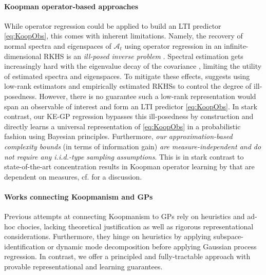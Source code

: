 \paragraph{Koopman operator-based approaches}
While operator regression \citep{Williams2015ADecomposition,Klus2020EigendecompositionsSpaces,Kostic2022LearningSpaces,Li2022OptimalLearning,Ishikawa2024,Mauroy2024,Meunier2024} could be applied to build an LTI predictor \eqref{eq:KoopObs}, this comes with inherent limitations. Namely, the recovery of normal spectra and eigenspaces of $\mathcal{A}_t$ using operator regression in an infinite-dimensional RKHS is an \textit{ill-posed inverse problem} \citep{Knapik2011,Knapik2016,Horowitz2014}. Spectral estimation gets increasingly hard with the eigenvalue decay of the covariance \citep{klebanov2020rigorous}, limiting the utility of estimated spectra and eigenspaces. To mitigate these effects, \citet{Kostic2023KoopmanEigenvalues} suggests using low-rank estimators and empirically estimated RKHSs \citep{kostic2024learning} to control the degree of ill-posedness. However, there is no guarantee such a low-rank representation would span an observable of interest and form an LTI predictor \eqref{eq:KoopObs}. In stark contrast, our KE-GP regression bypasses this ill-posedness by construction and directly learns a universal representation of \eqref{eq:KoopObs} in a probabilistic fashion using Bayesian principles.
    Furthermore, \textit{our approximation-based complexity bounds} (in terms of information gain) \textit{are measure-independent and do not require any i.i.d.-type sampling assumptions}. This is in stark contrast to state-of-the-art concentration results in Koopman operator learning by \cite{Kostic2022LearningSpaces,Kostic2023KoopmanEigenvalues} that are dependent on measures, cf. \citep{pmlr-v75-belkin18a} for a discussion.

\paragraph{Works connecting Koopmanism and GPs}
Previous attempts at connecting Koopmanism to GPs \citep{Lian2020OnOperators,10.1162/neco_a_01555,Loya2023}  rely on heuristics and ad-hoc chocies, lacking theoretical justification as well as rigorous representational considerations. Furthermore, they hinge on heuristics by applying subspace-identification or dynamic mode decomposition before applying Gaussian process regression. In contrast, we offer a principled and fully-tractable approach with provable representational and learning guarantees.


